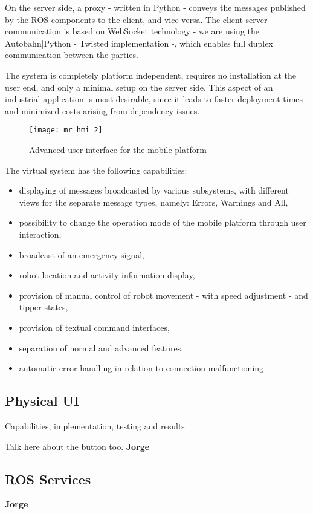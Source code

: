 	On the server side, a proxy - written in Python\cite{python} - conveys the messages published by the ROS\cite{ros} components to the client, and vice versa. The client-server communication is based on WebSocket\cite{ws} technology - we are using the Autobahn|Python\cite{autobahn} - Twisted\cite{twisted} implementation -, which enables full duplex communication between the parties.
	
	The system is completely platform independent, requires no installation at the user end, and only a minimal setup on the server side. This aspect of an industrial application is most desirable, since it leads to faster deployment times and minimized costs arising from dependency issues.
	
	\begin{figure}[H]
		\centering
		\texttt{[image: mr\_hmi\_2]}
		\caption{Advanced user interface for the mobile platform}
		\label{fig:mr_hmi_2}
	\end{figure}
	
	The virtual system has the following capabilities:
	
	\begin{itemize}
		\item displaying of messages broadcasted by various  subsystems, with different views for the separate message types, namely: Errors, Warnings and All,
		\item possibility to change the operation mode of the mobile platform through user interaction,
		\item broadcast of an emergency signal,
		\item robot location and activity information display,
		\item provision of manual control of robot movement - with speed adjustment - and tipper states,
		\item provision of textual command interfaces,
		\item separation of normal and advanced features,
		\item automatic error handling in relation to connection malfunctioning 
	\end{itemize}


	\subsection{Physical UI} %
	\label{sub:mr_physical_devices}
	
	Capabilities, implementation, testing and results
	
	Talk here about the button too.
	\textbf{Jorge}

	\subsection{ROS Services} %
	\label{sub:mr_ros_services}
	\textbf{Jorge}

